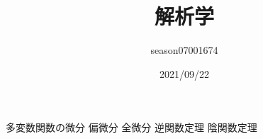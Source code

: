 \documentclass{jsarticle}
\title{解析学}
\author{season07001674}
\date{2021/09/22}
\begin{document}
\maketitle
\tableofcontents


多変数関数の微分
偏微分
全微分
逆関数定理
陰関数定理
\end{document}
